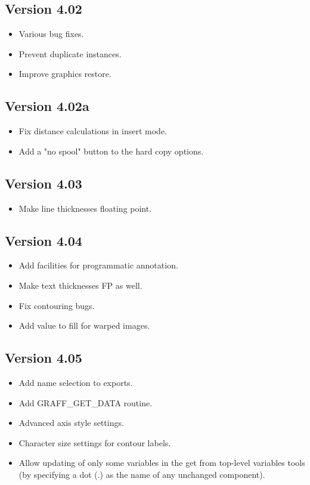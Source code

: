 \documentclass[11pt,twoside,english]{article}
\begin{document}
\subsection{Version 4.02}
\label{sec:v402}

 
\begin{itemize}
\item Various bug fixes.
\item Prevent duplicate instances.
\item Improve graphics restore.
\end{itemize}
\subsection{Version 4.02a}
\label{sec:v402a}

       
\begin{itemize}
\item Fix distance calculations in insert mode.
\item Add a "no spool" button to the hard copy options.
\end{itemize}
\subsection{ Version 4.03}
\label{sec:v403}

       
\begin{itemize}
\item Make line thicknesses floating point.
\end{itemize}
\subsection{Version 4.04}
\label{sec:v404}

       
\begin{itemize}
\item Add facilities for programmatic annotation.
\item Make text thicknesses FP as well.
\item Fix contouring bugs.
\item Add value to fill for warped images.
\end{itemize}
\subsection{Version 4.05}
\label{sec:v405}

       
\begin{itemize}
\item Add name selection to exports.
\item Add GRAFF\_GET\_DATA routine.
\item Advanced axis style settings.
\item Character size settings for contour labels.
\item Allow updating of only some variables in the get from top-level
  variables tools (by specifying a dot (.) as the name of any unchanged
  component).
\end{itemize}
\end{document}
